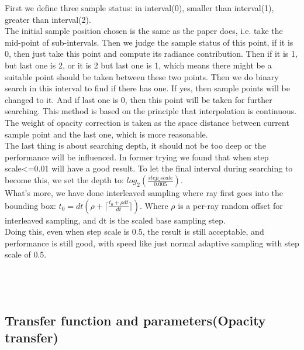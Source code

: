 \documentclass[acmtog]{acmart}
\begin{document}
First we define three sample status: in interval(0), smaller than interval(1), greater than interval(2).\\
The initial sample position chosen is the same as the paper does, i.e. take the mid-point of sub-intervals. Then we judge the sample status of this point, if it is 0, then just take this point and compute its radiance contribution. Then if it is 1, but last one is 2, or it is 2 but last one is 1, which means there might be a suitable point should be taken between these two points. Then we do binary search in this interval to find if there has one. If yes, then sample points will be changed to it. And if last one is 0, then this point will be taken for further searching.
This method is based on the principle that interpolation is continuous.\\
The weight of opacity correction is taken as the space distance between current sample point and the last one, which is more reasonable.\\
The last thing is about searching depth, it should not be too deep or the performance will be influenced. In former trying we found that when step scale<=0.01 will have a good result. To let the final interval during searching to become this, we set the depth to: $log_2(\frac{step\_scale}{0.005})$.\\
What's more, we have done interleaved sampling where ray first goes into the bounding box: $t_0=dt(\rho + \lceil \frac{t_0+\rho dt}{dt}\rceil)$. Where $\rho$ is a per-ray random offset for interleaved sampling, and dt is the scaled base sampling step.\\
Doing this, even when step scale is 0.5, the result is still acceptable, and performance is still good, with speed like just normal adaptive sampling with step scale of 0.5.\\
\\
\\
\\
\subsection{Transfer function and parameters(Opacity transfer)}
\end{document}
